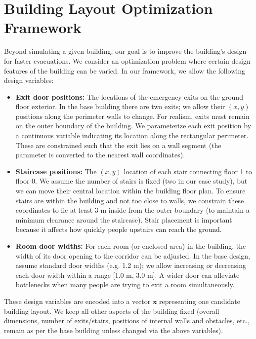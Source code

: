 \documentclass[11pt,a4paper]{article}
\begin{document}
\section{Building Layout Optimization Framework}
Beyond simulating a given building, our goal is to improve the building's design for faster evacuations. We consider an optimization problem where certain design features of the building can be varied. In our framework, we allow the following design variables:
\begin{itemize}
    \item \textbf{Exit door positions:} The locations of the emergency exits on the ground floor exterior. In the base building there are two exits; we allow their $(x,y)$ positions along the perimeter walls to change. For realism, exits must remain on the outer boundary of the building. We parameterize each exit position by a continuous variable indicating its location along the rectangular perimeter. These are constrained such that the exit lies on a wall segment (the parameter is converted to the nearest wall coordinates).
    \item \textbf{Staircase positions:} The $(x,y)$ location of each stair connecting floor 1 to floor 0. We assume the number of stairs is fixed (two in our case study), but we can move their central location within the building floor plan. To ensure stairs are within the building and not too close to walls, we constrain these coordinates to lie at least 3 m inside from the outer boundary (to maintain a minimum clearance around the staircase). Stair placement is important because it affects how quickly people upstairs can reach the ground.
    \item \textbf{Room door widths:} For each room (or enclosed area) in the building, the width of its door opening to the corridor can be adjusted. In the base design, assume standard door widths (e.g. 1.2 m); we allow increasing or decreasing each door width within a range [1.0 m, 3.0 m]. A wider door can alleviate bottlenecks when many people are trying to exit a room simultaneously.
\end{itemize}
These design variables are encoded into a vector $\mathbf{x}$ representing one candidate building layout. We keep all other aspects of the building fixed (overall dimensions, number of exits/stairs, positions of internal walls and obstacles, etc., remain as per the base building unless changed via the above variables).
\end{document}
